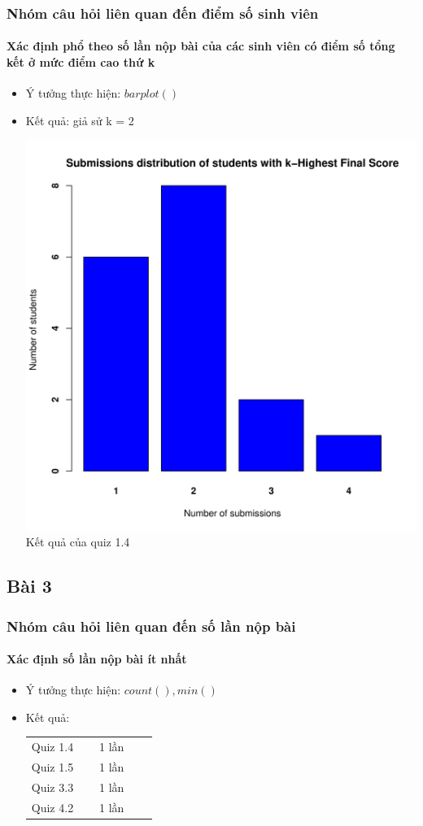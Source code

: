 \documentclass[english,10pt,table]{beamer}
\begin{document}
\frame
{
\frametitle{Nhóm câu hỏi liên quan đến điểm số sinh viên}
\framesubtitle{Xác định phổ theo số lần nộp bài của các sinh viên có điểm số tổng kết ở mức điểm cao thứ k}
\begin{itemize}
    \item Ý tưởng thực hiện: $barplot()$
    \item Kết quả: giả sử k = 2\\
    \begin{center}
        \includegraphics[width = 6 cm]{Images/img2-7-1.png}\\
        Kết quả của quiz 1.4
    \end{center}
\end{itemize}
}

\subsection{Bài 3}
\frame
{
\frametitle{Nhóm câu hỏi liên quan đến số lần nộp bài}
\framesubtitle{Xác định số lần nộp bài ít nhất}
\begin{itemize}
    \item Ý tưởng thực hiện: $count(), min()$
    \item Kết quả:\\
    \begin{center}
        \begin{tabular}{l l c c c}
             Quiz 1.4 & $\;$ & 1 lần\\
             Quiz 1.5 & $\;$ & 1 lần\\
             Quiz 3.3 & $\;$ & 1 lần\\
             Quiz 4.2 & $\;$ & 1 lần
        \end{tabular}
    \end{center}
\end{itemize}
}
\end{document}
